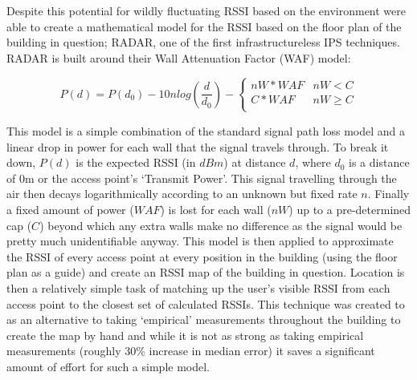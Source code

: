 \documentclass{UoYCSproject}
\begin{document}
                Despite this potential for wildly fluctuating RSSI based on the environment \citet{bahl2000radar} were able to create a mathematical model for the RSSI based on the floor plan of the building in question; RADAR, one of the first infrastructureless IPS techniques. RADAR is built around their Wall Attenuation Factor (WAF) model:
            
                \begin{equation} \label{eq:WAF}
                    P(d) = P(d_0) - 10nlog\left(\frac{d}{d_0}\right) - \left\lbrace 
                        \begin{matrix}
                            nW * WAF & nW < C \\
                            C * WAF  & nW \geq C \\
                        \end{matrix}
                    \right.
                \end{equation}
            
                This model is a simple combination of the standard signal path loss model and a linear drop in power for each wall that the signal travels through. To break it down, $P(d)$ is the expected RSSI (in $dBm$) at distance $d$, where $d_0$ is a distance of $0$m or the access point's `Transmit Power'. This signal travelling through the air then decays logarithmically according to an unknown but fixed rate $n$. Finally a fixed amount of power ($WAF$) is lost for each wall ($nW$) up to a pre-determined cap ($C$) beyond which any extra walls make no difference as the signal would be pretty much unidentifiable anyway. This model is then applied to approximate the RSSI of every access point at every position in the building (using the floor plan as a guide) and create an RSSI map of the building in question. Location is then a relatively simple task of matching up the user's visible RSSI from each access point to the closest set of calculated RSSIs. This technique was created to as an alternative to taking `empirical' measurements throughout the building to create the map by hand and while it is not as strong as taking empirical measurements (roughly 30\% increase in median error) it saves a significant amount of effort for such a simple model.
                
\end{document}
